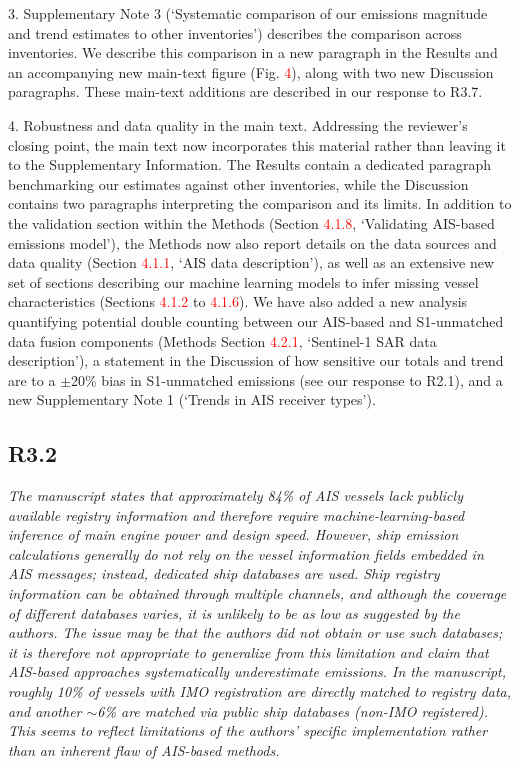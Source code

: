 \documentclass[11pt]{article}
\newcommand{\point}[1]{\subsection*{\normalfont\bfseries #1}}
\begin{document}
3. Supplementary Note 3 (`Systematic comparison of our emissions magnitude and trend estimates to other inventories') describes the comparison across inventories. We describe this comparison in a new paragraph in the Results and an accompanying new main-text figure (Fig. \textcolor{red}{4}), along with two new Discussion paragraphs. These main-text additions are described in our response to R3.7.

4. Robustness and data quality in the main text. Addressing the reviewer's closing point, the main text now incorporates this material rather than leaving it to the Supplementary Information. The Results contain a dedicated paragraph benchmarking our estimates against other inventories, while the Discussion contains two paragraphs interpreting the comparison and its limits. In addition to the validation section within the Methods (Section \textcolor{red}{4.1.8}, `Validating AIS-based emissions model'), the Methods now also report details on the data sources and data quality (Section \textcolor{red}{4.1.1}, `AIS data description'), as well as an extensive new set of sections describing our machine learning models to infer missing vessel characteristics (Sections \textcolor{red}{4.1.2} to \textcolor{red}{4.1.6}). We have also added a new analysis quantifying potential double counting between our AIS-based and S1-unmatched data fusion components (Methods Section \textcolor{red}{4.2.1}, `Sentinel-1 SAR data description'), a statement in the Discussion of how sensitive our totals and trend are to a $\pm$20\% bias in S1-unmatched emissions (see our response to R2.1), and a new Supplementary Note 1 (`Trends in AIS receiver types').

\point{R3.2}

\begin{refquote}\itshape
The manuscript states that approximately 84\% of AIS vessels lack publicly
available registry information and therefore require machine-learning-based
inference of main engine power and design speed. However, ship emission
calculations generally do not rely on the vessel information fields embedded in
AIS messages; instead, dedicated ship databases are used. Ship registry
information can be obtained through multiple channels, and although the coverage
of different databases varies, it is unlikely to be as low as suggested by the
authors. The issue may be that the authors did not obtain or use such databases;
it is therefore not appropriate to generalize from this limitation and claim
that AIS-based approaches systematically underestimate emissions. In the
manuscript, roughly 10\% of vessels with IMO registration are directly matched
to registry data, and another $\sim$6\% are matched via public ship databases
(non-IMO registered). This seems to reflect limitations of the authors' specific
implementation rather than an inherent flaw of AIS-based methods.
\end{refquote}
\end{document}
